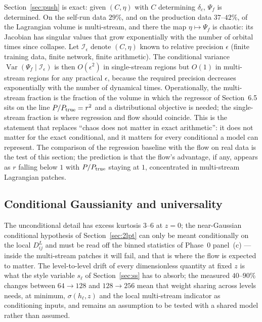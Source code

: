 \documentclass[11pt]{article}
\theoremstyle{definition}
\newcommand{\Psif}{\Psi_{f}}
\newcommand{\Var}{\operatorname{Var}}
\begin{document}
Section~\ref{sec:push} is exact: given $(C,\eta)$ with $C$ determining $\delta_c$, $\Psif$ is determined. On the self-run data $29\%$, and on the production data $37$--$42\%$, of the Lagrangian volume is multi-stream, and there the map $\eta\mapsto\Psif$ is chaotic: its Jacobian has singular values that grow exponentially with the number of orbital times since collapse. Let $\mathcal I_\epsilon$ denote $(C,\eta)$ known to relative precision $\epsilon$ (finite training data, finite network, finite arithmetic). The conditional variance $\Var(\Psif\mid\mathcal I_\epsilon)$ is then $O(\epsilon^2)$ in single-stream regions but $O(1)$ in multi-stream regions for any practical $\epsilon$, because the required precision decreases exponentially with the number of dynamical times. Operationally, the multi-stream fraction is the fraction of the volume in which the regressor of Section~6.5 sits on the line $P/P_{\rm true}=r^2$ and a distributional objective is needed; the single-stream fraction is where regression and flow should coincide. This is the statement that replaces ``chaos does not matter in exact arithmetic'': it does not matter for the exact conditional, and it matters for every conditional a model can represent. The comparison of the regression baseline with the flow on real data is the test of this section; the prediction is that the flow's advantage, if any, appears as $r$ falling below $1$ with $P/P_{\rm true}$ staying at $1$, concentrated in multi-stream Lagrangian patches.

\subsection{Conditional Gaussianity and universality}

The unconditional detail has excess kurtosis $3$--$6$ at $z=0$; the near-Gaussian conditional hypothesis of Section~\ref{sec:2lpt} can only be meant conditionally on the local $D^L_{ij}$ and must be read off the binned statistics of Phase~0 panel~(c) --- inside the multi-stream patches it will fail, and that is where the flow is expected to matter. The level-to-level drift of every dimensionless quantity at fixed $z$ is what the style variable $s_\ell$ of Section~\ref{sec:ss} has to absorb; the measured $40$--$90\%$ changes between $64\to128$ and $128\to256$ mean that weight sharing across levels needs, at minimum, $\sigma(h_\ell,z)$ and the local multi-stream indicator as conditioning inputs, and remains an assumption to be tested with a shared model rather than assumed.
\end{document}

